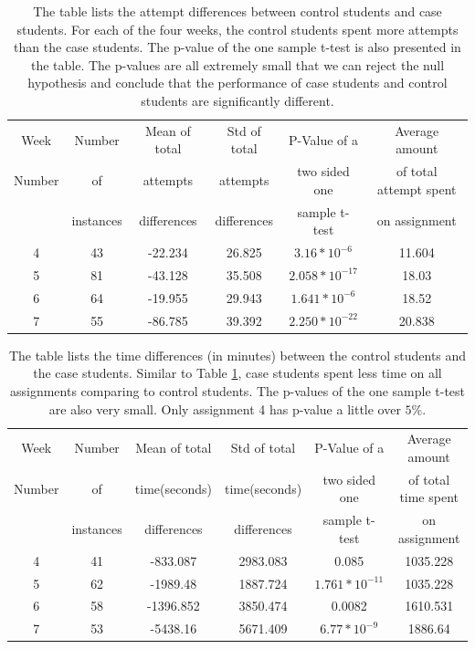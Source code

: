 \documentclass{llncs2e/llncs}
\begin{document}
\begin{table}[th]
\caption{The table lists the attempt differences between control students and case students. For each of the four weeks, the control students spent more attempts than the case students. The p-value of the one sample t-test is also presented in the table. The p-values are all extremely small that we can reject the null hypothesis and conclude that the performance of case students and control students are significantly different.}
\begin{center}
  \begin{tabular}{| c | c | c | c | c | c |}
  \hline
    Week & Number& Mean of total & Std of total &  P-Value of a &Average amount \\
    Number & of & attempts & attempts & two sided one & of total attempt spent\\
     & instances & differences & differences & sample t-test & on assignment   \\ \hline
	4 & 43 & -22.234 & 26.825 & $3.16 * 10^{-6}$ & 11.604\\
	5 & 81 & -43.128 & 35.508 & $2.058 * 10 ^{-17}$ & 18.03\\
	6 & 64 & -19.955 & 29.943 & $1.641 * 10^{-6}$ &  18.52\\
	7 & 55 & -86.785 & 39.392 & $2.250 * 10^{-22}$ & 20.838\\
	\hline
  \end{tabular}
  \label{tab:no_hint}
  \end{center}
\end{table}

\begin{table}
\caption{The table lists the time differences (in minutes) between the control students and the case students. Similar to Table \ref{tab:no_hint}, case students spent less time on all assignments comparing to control students. The p-values of the one sample t-test are also very small. Only assignment 4 has p-value a little over $5\%$.}
\begin{center}
  \begin{tabular}{| c | c | c | c | c | c |}
    \hline
    Week & Number& Mean of total & Std of total &  P-Value of a &Average amount \\
    Number & of & time(seconds) & time(seconds) & two sided one & of total time spent\\
     & instances & differences & differences & sample t-test & on assignment   \\ \hline
	4 & 41 & -833.087 & 2983.083 & 0.085 & 1035.228\\
	5 & 62 & -1989.48 &1887.724 & $1.761 * 10^{-11}$ & 1035.228\\
	6 & 58 & -1396.852 & 3850.474 & 0.0082 & 1610.531 \\
	7 & 53 & -5438.16 & 5671.409 & $6.77 * 10^{-9}$ & 1886.64\\
	\hline
  \end{tabular}
  \label{tab:no_hint_time}
  \end{center}
\end{table}
\end{document}
